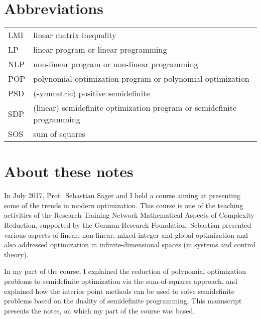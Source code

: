 \clearpage 

\section*{Abbreviations}

\begin{tabular}{ll}
	LMI & linear matrix inequality 
	\\ LP & linear program or linear programming 
	\\ NLP & non-linear program or non-linear programming 
	\\ POP & polynomial optimization program or polynomial optimization
	\\ PSD & (symmetric) positive semidefinite
	\\ SDP & (linear) semidefinite optimization program or semidefinite programming
	\\ SOS & sum of squares
\end{tabular}

\clearpage 

\section*{About these notes} 

In July 2017, Prof.~Sebastian Sager and I held a course aiming at presenting some of the trends in modern optimization. This course is one of the teaching activities of the Research Training Network Mathematical Aspects of Complexity Reduction, supported by the German Research Foundation. Sebastian presented various aspects of linear, non-linear, mixed-integer and global optimization and also addressed optimization in infinite-dimensional spaces (in systems and control theory). 

In my part of the course, I explained the reduction of polynomial optimization problems to semidefinite optimization via the sum-of-squares approach, and explained how the interior point methods can be used to solve semidefinite problems based on the duality of semidefinite programming. This manuscript presents the notes, on which my part of the course was based.

